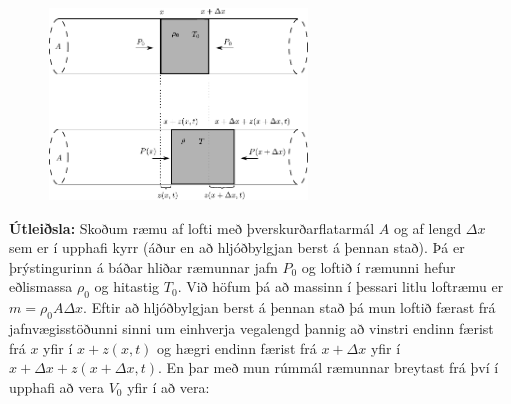 \begin{minipage}{\linewidth}

\begin{figure}
\vspace{-0.5cm}
\includegraphics[width=2.7in]{figures/loft-pipa.pdf}
\end{figure}

\textbf{Útleiðsla:} Skoðum ræmu af lofti með þverskurðarflatarmál $A$ og af lengd $\Delta x$ sem er í upphafi kyrr (áður en að hljóðbylgjan berst á þennan stað). Þá er þrýstingurinn á báðar hliðar ræmunnar jafn $P_0$ og loftið í ræmunni hefur eðlismassa $\rho_0$ og hitastig $T_0$. Við höfum þá að massinn í þessari litlu loftræmu er $m = \rho_0 A \Delta x$. Eftir að hljóðbylgjan berst á þennan stað þá mun loftið færast frá jafnvægisstöðunni sinni um einhverja vegalengd þannig að vinstri endinn færist frá $x$ yfir í $x + z(x,t)$ og hægri endinn færist frá $x + \Delta x$ yfir í $x + \Delta x + z(x+\Delta x, t)$. En þar með mun rúmmál ræmunnar breytast frá því í upphafi að vera $V_0$ yfir í að vera:
\end{minipage}

